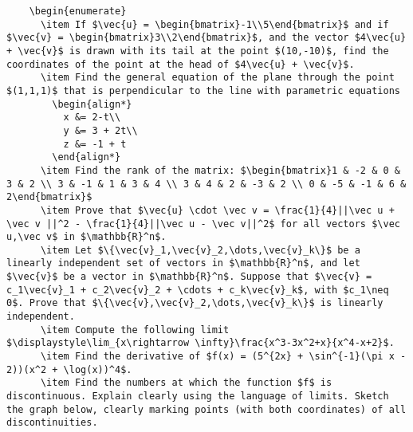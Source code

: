 \documentclass[11pt]{extarticle}
\title{}
\author{Avinash Iyer}
\date{}
\begin{document}
{
  \begin{lstlisting}
    \begin{enumerate}
      \item If $\vec{u} = \begin{bmatrix}-1\\5\end{bmatrix}$ and if $\vec{v} = \begin{bmatrix}3\\2\end{bmatrix}$, and the vector $4\vec{u} + \vec{v}$ is drawn with its tail at the point $(10,-10)$, find the coordinates of the point at the head of $4\vec{u} + \vec{v}$.
      \item Find the general equation of the plane through the point $(1,1,1)$ that is perpendicular to the line with parametric equations
        \begin{align*}
          x &= 2-t\\
          y &= 3 + 2t\\
          z &= -1 + t
        \end{align*}
      \item Find the rank of the matrix: $\begin{bmatrix}1 & -2 & 0 & 3 & 2 \\ 3 & -1 & 1 & 3 & 4 \\ 3 & 4 & 2 & -3 & 2 \\ 0 & -5 & -1 & 6 & 2\end{bmatrix}$
      \item Prove that $\vec{u} \cdot \vec v = \frac{1}{4}||\vec u + \vec v ||^2 - \frac{1}{4}||\vec u - \vec v||^2$ for all vectors $\vec u,\vec v$ in $\mathbb{R}^n$.
      \item Let $\{\vec{v}_1,\vec{v}_2,\dots,\vec{v}_k\}$ be a linearly independent set of vectors in $\mathbb{R}^n$, and let $\vec{v}$ be a vector in $\mathbb{R}^n$. Suppose that $\vec{v} = c_1\vec{v}_1 + c_2\vec{v}_2 + \cdots + c_k\vec{v}_k$, with $c_1\neq 0$. Prove that $\{\vec{v},\vec{v}_2,\dots,\vec{v}_k\}$ is linearly independent.
      \item Compute the following limit $\displaystyle\lim_{x\rightarrow \infty}\frac{x^3-3x^2+x}{x^4-x+2}$.
      \item Find the derivative of $f(x) = (5^{2x} + \sin^{-1}(\pi x - 2))(x^2 + \log(x))^4$.
      \item Find the numbers at which the function $f$ is discontinuous. Explain clearly using the language of limits. Sketch the graph below, clearly marking points (with both coordinates) of all discontinuities.

\end{lstlisting}}
\end{document}
